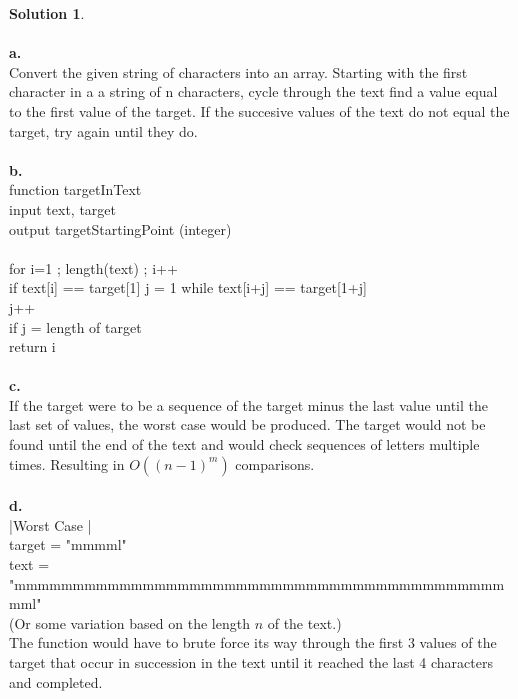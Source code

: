\documentclass{article}
\theoremstyle{definition}
\newtheorem*{solution}{Solution}
\begin{document}
\begin{solution}\ \\
\ \\
\textbf{a.}\ \\
Convert the given string of characters into an array. Starting with the first character in a a string of n characters, cycle through the text find a value equal to the first value of the target. If the succesive values of the text do not equal the target, try again until they do.\ \\
\ \\
\textbf{b.}\ \\
function targetInText\ \\
input text, target\ \\
output targetStartingPoint (integer)\ \\
\ \\
for i=1 ; length(text) ; i++\ \\
if text[i] == target[1]
j = 1
while text[i+j] == target[1+j]\ \\
\indent j++\ \\
\indent if j = length of target\ \\
\indent \indent return i\ \\
\ \\
\textbf{c.}\ \\
If the target were to be a sequence of the target minus the last value until the last set of values, the worst case would be produced. The target would not be found until the end of the text and would check sequences of letters multiple times. Resulting in $O((n-1)^m)$ comparisons.
\ \\
\ \\
\textbf{d.}\ \\
|Worst Case |\ \\
target = "mmmml"\ \\
text = "mmmmmmmmmmmmmmmmmmmmmmmmmmmmmmmmmmmmmmmmmmmml"\ \\
(Or some variation based on the length $n$ of the text.)\ \\
The function would have to brute force its way through the first 3 values of the target that occur in succession in the text until it reached the last 4 characters and completed.\ \\
\end{solution}
\end{document}

